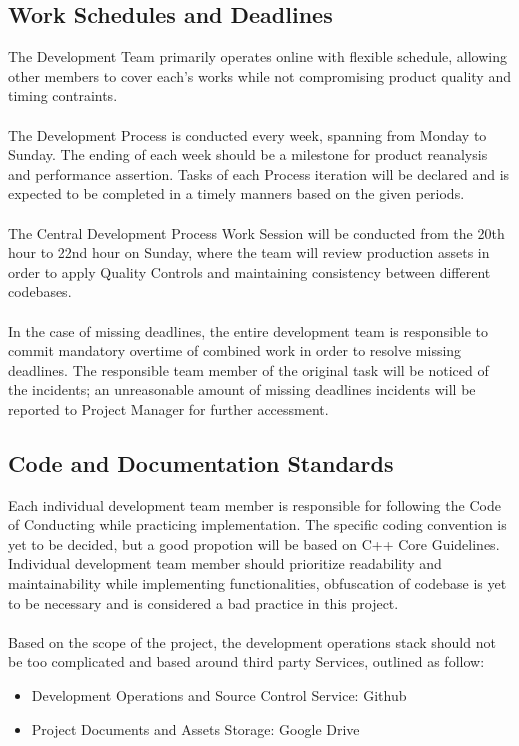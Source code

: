         \subsection{Work Schedules and Deadlines}
        The Development Team primarily operates online with flexible schedule, allowing other members to cover each's works while not compromising product quality
        and timing contraints.
        \\\\
        The Development Process is conducted every week, spanning from Monday to Sunday. The ending of each week should be a milestone for product reanalysis and 
        performance assertion. Tasks of each Process iteration will be declared and is expected to be completed in a timely manners based on the given periods.
        \\\\
        The Central Development Process Work Session will be conducted from the 20th hour to 22nd hour on Sunday, where the team will review production assets in order
        to apply Quality Controls and maintaining consistency between different codebases.
        \\\\
        In the case of missing deadlines, the entire development team is responsible to commit mandatory overtime of combined work in order to resolve missing deadlines.
        The responsible team member of the original task will be noticed of the incidents; an unreasonable amount of missing deadlines incidents will be reported to Project
        Manager for further accessment.

        \subsection{Code and Documentation Standards}
        Each individual development team member is responsible for following the Code of Conducting while practicing implementation. The specific coding convention
        is yet to be decided, but a good propotion will be based on C++ Core Guidelines.
        \\
        Individual development team member should prioritize readability and maintainability while implementing functionalities, obfuscation of codebase is yet to be
        necessary and is considered a bad practice in this project.
        \\\\
        Based on the scope of the project, the development operations stack should not be too complicated and based around third party Services, outlined as follow:
        \begin{itemize}
            \item Development Operations and Source Control Service: Github
            \item Project Documents and Assets Storage: Google Drive
        \end{itemize}


